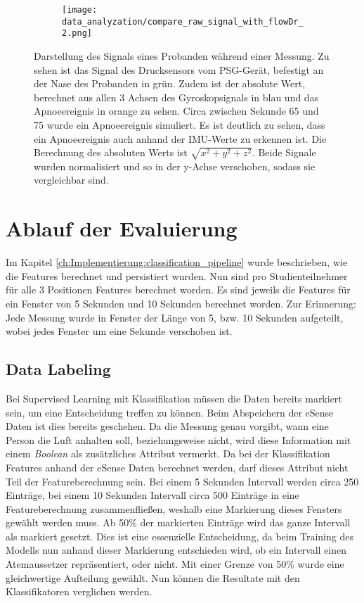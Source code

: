 \begin{figure}[ht]
  \centering
  \begin{subfigure}{0.7\textwidth}
      \texttt{[image: data\_analyzation/compare\_raw\_signal\_with\_flowDr\_2.png]}
    \end{subfigure}
  \caption{Darstellung des Signals eines Probanden während einer Messung. Zu sehen ist das Signal des Drucksensors vom PSG-Gerät, befestigt an der Nase des Probanden in grün. Zudem ist der absolute Wert, berechnet aus allen 3 Achsen des Gyroskopsignals in blau und das Apnoeereignis in orange zu sehen. Circa zwischen Sekunde 65 und 75 wurde ein Apnoeereignis simuliert. Es ist deutlich zu sehen, dass ein Apnoeereignis auch anhand der IMU-Werte zu erkennen ist. Die Berechnung des absoluten Werts ist $\sqrt{x^2+y^2+z^2}$. Beide Signale wurden normalisiert und so in der y-Achse verschoben, sodass sie vergleichbar sind.}
  \label{evaluation:rawPlot}
\end{figure}

\section{Ablauf der Evaluierung}
Im Kapitel \ref{ch:Implementierung:classification_pipeline} wurde beschrieben, wie die Features berechnet und persistiert wurden. 
Nun sind pro Studienteilnehmer für alle 3 Positionen Features berechnet worden. 
Es sind jeweils die Features für ein Fenster von 5 Sekunden und 10 Sekunden berechnet worden.
Zur Erinnerung: Jede Messung wurde in Fenster der Länge von 5, bzw. 10 Sekunden aufgeteilt, wobei jedes Fenster um eine Sekunde verschoben ist.

\subsection{Data Labeling}
Bei Supervised Learning mit Klassifikation müssen die Daten bereits markiert sein, um eine Entscheidung treffen zu können. 
Beim Abspeichern der eSense Daten ist dies bereits geschehen.
Da die Messung genau vorgibt, wann eine Person die Luft anhalten soll, beziehungsweise nicht, wird diese Information mit einem \textit{Boolean} als zusätzliches Attribut vermerkt.
Da bei der Klassifikation Features anhand der eSense Daten berechnet werden, darf dieses Attribut nicht Teil der Featureberechnung sein.
Bei einem 5 Sekunden Intervall werden circa 250 Einträge, bei einem 10 Sekunden Intervall circa 500 Einträge in eine Featureberechnung zusammenfließen, weshalb eine Markierung dieses Fensters gewählt werden muss.
Ab 50\% der markierten Einträge wird das ganze Intervall als markiert gesetzt.
Dies ist eine essenzielle Entscheidung, da beim Training des Modells nun anhand dieser Markierung entschieden wird, ob ein Intervall einen Atemaussetzer repräsentiert, oder nicht.
Mit einer Grenze von 50\% wurde eine gleichwertige Aufteilung gewählt.
Nun können die Resultate mit den Klassifikatoren verglichen werden.

